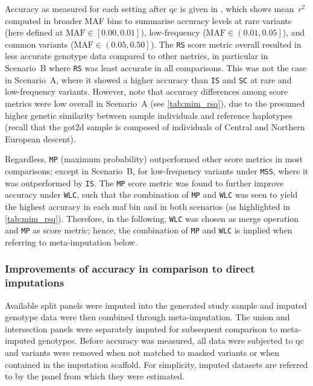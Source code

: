 %

%

Accuracy as measured for each setting after \gls{qc} is given in , which shows mean~$r^2$ computed in  broader MAF bins to summarise accuracy levels at
rare variants (here defined at ${\text{MAF} \in \left[ 0.00, 0.01\right]}$),
low-frequency (${\text{MAF} \in \left( 0.01, 0.05\right]}$), and
common variants (${\text{MAF} \in \left( 0.05, 0.50\right]}$).
The \texttt{RS} score metric overall resulted in less accurate genotype data compared to other metrics, in particular in Scenario~B where \texttt{RS} was least accurate in all comparisons. This was not the case in Scenario~A, where it showed a higher accuracy than \texttt{IS} and \texttt{SC} at rare and low-frequency variants.
However, note that accuracy differences among score metrics were low overall in Scenario~A (see \cref{tab:mim_rsq}), due to the presumed higher genetic similarity between sample individuals and reference haplotypes (recall that the \gls{got2d} sample is composed of individuals of Central and Northern European descent).

Regardless, \texttt{MP} (maximum probability) outperformed other score metrics in most comparisons; except in Scenario~B, for low-frequency variants under \texttt{MSS}, where it was outperformed by \texttt{IS}.
The \texttt{MP} score metric was found to further improve accuracy under \texttt{WLC}, such that the combination of \texttt{MP} and \texttt{WLC} was seen to yield the highest accuracy in each \gls{maf} bin and in both scenarios (as highlighted in \cref{tab:mim_rsq}).
Therefore, in the following, \texttt{WLC} was chosen as merge operation and \texttt{MP} as score metric; hence, the combination of \texttt{MP} and \texttt{WLC} is implied when referring to meta-imputation below.


%
\subsubsection{Improvements of accuracy in comparison to direct imputations}
%

Available split panels were imputed into the generated study sample and imputed genotype data were then combined through meta-imputation.
The union and intersection panels were separately imputed for subsequent comparison to meta-imputed genotypes.
Before accuracy was measured, all data were subjected to \gls{qc} and variants were removed when not matched to masked variants or when contained in the imputation scaffold.
For simplicity, imputed datasets are referred to by the panel from which they were estimated.

